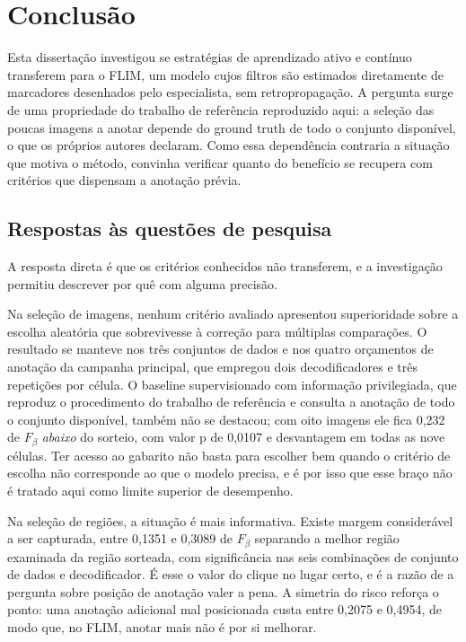 \chapter{Conclusão}\label{cap_5}

Esta dissertação investigou se estratégias de aprendizado ativo e contínuo transferem para o \ac{FLIM}, um modelo cujos filtros são estimados diretamente de marcadores desenhados pelo especialista, sem retropropagação. A pergunta surge de uma propriedade do trabalho de referência reproduzido aqui: a seleção das poucas imagens a anotar depende do ground truth de todo o conjunto disponível, o que os próprios autores declaram. Como essa dependência contraria a situação que motiva o método, convinha verificar quanto do benefício se recupera com critérios que dispensam a anotação prévia.

\section{Respostas às questões de pesquisa}

A resposta direta é que os critérios conhecidos não transferem, e a investigação permitiu descrever por quê com alguma precisão.

Na seleção de imagens, nenhum critério avaliado apresentou superioridade sobre a escolha aleatória que sobrevivesse à correção para múltiplas comparações. O resultado se manteve nos três conjuntos de dados e nos quatro orçamentos de anotação da campanha principal, que empregou dois decodificadores e três repetições por célula. O baseline supervisionado com informação privilegiada, que reproduz o procedimento do trabalho de referência e consulta a anotação de todo o conjunto disponível, também não se destacou; com oito imagens ele fica 0,232 de $F_\beta$ \emph{abaixo} do sorteio, com valor p de 0,0107 e desvantagem em todas as nove células. Ter acesso ao gabarito não basta para escolher bem quando o critério de escolha não corresponde ao que o modelo precisa, e é por isso que esse braço não é tratado aqui como limite superior de desempenho.

Na seleção de regiões, a situação é mais informativa. Existe margem considerável a ser capturada, entre 0,1351 e 0,3089 de $F_\beta$ separando a melhor região examinada da região sorteada, com significância nas seis combinações de conjunto de dados e decodificador. É esse o valor do clique no lugar certo, e é a razão de a pergunta sobre posição de anotação valer a pena. A simetria do risco reforça o ponto: uma anotação adicional mal posicionada custa entre 0,2075 e 0,4954, de modo que, no \ac{FLIM}, anotar mais não é por si melhorar.

